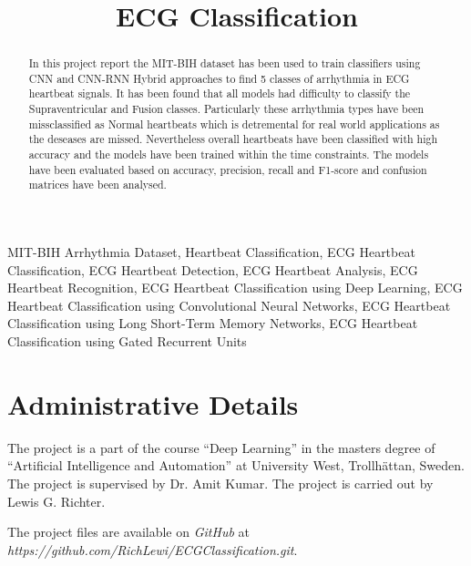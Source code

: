 \documentclass[conference]{IEEEtran}
\begin{document}
\title{ECG Classification}
\author{}

\maketitle

\begin{abstract}
In this project report the MIT-BIH dataset has been used to train classifiers using CNN and CNN-RNN Hybrid approaches to find 5 classes of arrhythmia in ECG heartbeat signals. It has been found that all models had difficulty to classify the Supraventricular and Fusion classes. Particularly these arrhythmia types have been missclassified as Normal heartbeats which is detremental for real world applications as the deseases are missed. Nevertheless overall heartbeats have been classified with high accuracy and the models have been trained within the time constraints. The models have been evaluated based on accuracy, precision, recall and F1-score and confusion matrices have been analysed. 
\end{abstract}

\begin{IEEEkeywords}
MIT-BIH Arrhythmia Dataset, Heartbeat Classification, ECG Heartbeat Classification, ECG Heartbeat Detection, ECG Heartbeat Analysis, ECG Heartbeat Recognition, ECG Heartbeat Classification using Deep Learning, ECG Heartbeat Classification using Convolutional Neural Networks, ECG Heartbeat Classification using Long Short-Term Memory Networks, ECG Heartbeat Classification using Gated Recurrent Units
\end{IEEEkeywords}

\section{Administrative Details}
The project is a part of the course ``Deep Learning'' in the masters degree of ``Artificial Intelligence and Automation'' at University West, Trollhättan, Sweden. The project is supervised by Dr. Amit Kumar. The project is carried out by Lewis G. Richter.

The project files are available on \textit{GitHub} at \textit{https://github.com/RichLewi/ECGClassification.git}.
\end{document}
